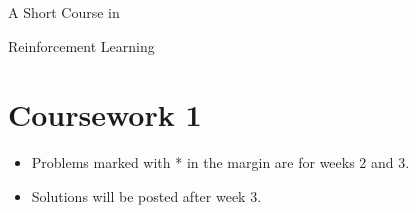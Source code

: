 \documentclass[11pt,a4paper]{article}
\begin{document}
\ddmmyyyydate
\graphicspath{{/Users/ht/Library/SUlogo/}}

\pagestyle{plain}

\vspace*{-0.7in}
\hfill{}%

\vspace*{-18mm}

{\huge
A Short Course in

\vspace*{1ex}

Reinforcement Learning\\
}

\vspace*{-7mm}

\section{Coursework 1}

\begin{itemize}
\setlength{\itemsep}{0pt}
\item Problems marked with * in the margin are for weeks 2 and 3.
\item Solutions will be posted after week 3.
\end{itemize}
\end{document}
